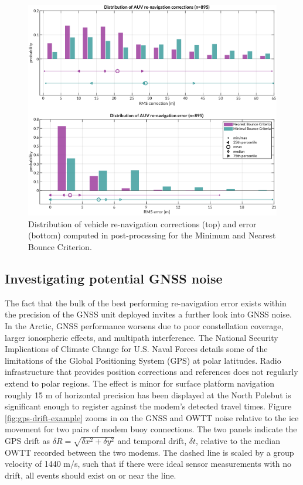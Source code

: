 \begin{figure}[!ht]
\includegraphics[width=\textwidth]{figs/auv-trilat-stat.pdf}
\caption{Distribution of vehicle re-navigation corrections (top) and error (bottom) computed in post-processing for the Minimum and Nearest Bounce Criterion.}
\label{fig:trilat-auv}
\end{figure}

\subsection{Investigating potential GNSS noise}

The fact that the bulk of the best performing re-navigation error exists within the precision of the GNSS unit deployed invites a further look into GNSS noise.
In the Arctic, GNSS performance worsens due to poor constellation coverage, larger ionospheric effects, and multipath interference.
The National Security Implications of Climate Change for U.S. Naval Forces \citep{NAP12914} details some of the limitations of the Global Positioning System (GPS) at polar latitudes.
Radio infrastructure that provides position corrections and references does not regularly extend to polar regions.
The effect is minor for surface platform navigation \textemdash roughly 15 m of horizontal precision has been displayed at the North Pole\textemdash but is significant enough to register against the modem's detected travel times.
Figure \ref{fig:gps-drift-example} zooms in on the GNSS and OWTT noise relative to the ice movement for two pairs of modem buoy connections.
The two panels indicate the GPS drift as $\delta R = \sqrt{\delta x^2 + \delta y^2}$ and temporal drift, $\delta t$, relative to the median OWTT recorded between the two modems.
The dashed line is scaled by a group velocity of 1440 m/s, such that if there were ideal sensor measurements with no drift, all events should exist on or near the line.

